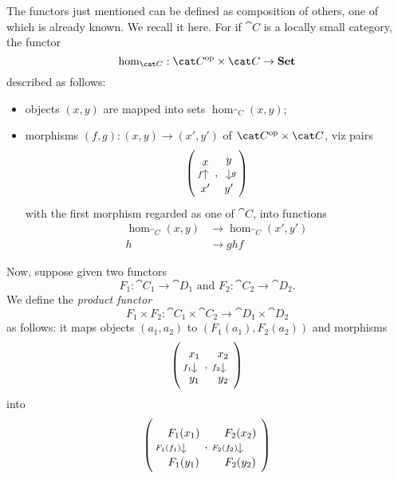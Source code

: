 \begin{exercise}
The functors just mentioned can be defined as composition of others, one of which is already known. We recall it here. For if \(\cat C\) is a locally small category, the functor
\[\hom_{\cat C} : \opcat C \times \cat C \to \Set\]
described as follows:
\begin{itemize}
\item objects \((x, y)\) are mapped into sets \(\hom_{\cat C}(x, y)\);
\item morphisms \((f, g) : (x, y) \to (x', y')\) of \(\opcat C \times \cat C\), viz pairs
\[\left(\begin{tikzcd}[row sep=small]x \\ x' \ar["f", u]\end{tikzcd}, \begin{tikzcd}[row sep=small]y \ar["g", d] \\ y'\end{tikzcd}\right)\]
with the first morphism regarded as one of \(\cat C\), into functions
\[\begin{aligned}
\hom_{\cat C}(x, y) &\to \hom_{\cat C}(x', y') \\
h &\to ghf
\end{aligned}\] 
\end{itemize}
Now, suppose given two functors
\[F_1 : \cat C_1 \to \cat D_1 \text{ and } F_2 : \cat C_2 \to \cat D_2.\]
We define the {\em product functor}
\[F_1 \times F_2 : \cat C_1 \times \cat C_2 \to \cat D_1 \times \cat D_2\]
as follows: it maps objects \((a_1, a_2)\) to \((F_1(a_1), F_2(a_2))\) and morphisms
\[\left(
\begin{tikzcd}[row sep=small]x_1 \ar["{f_1}", d, swap] \\ y_1\end{tikzcd},
\begin{tikzcd}[row sep=small]x_2 \ar["{f_2}", d, swap] \\ y_2\end{tikzcd}
\right)\]
into
\[\left(
\begin{tikzcd}[row sep=small]F_1(x_1) \ar["{F_1(f_1)}", d, swap] \\ F_1(y_1)\end{tikzcd},
\begin{tikzcd}[row sep=small]F_2(x_2) \ar["{F_2(f_2)}", d, swap] \\ F_2(y_2)\end{tikzcd}
\right)\]
\end{exercise}

